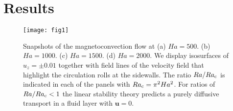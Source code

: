 \documentclass{jfm}
\begin{document}
\section{Results}
\begin{figure}
\centering
\texttt{[image: fig1]}
\caption{Snapshots of the magnetoconvection flow at (a) $Ha=500$. (b) $Ha=1000$. (c) $Ha=1500$. (d) $Ha=2000$. 
We display isosurfaces of $u_z=\pm 0.01$ together with field lines of the velocity field that highlight the circulation rolls 
at the sidewalls. The ratio $Ra/Ra_{\rm c}$ is indicated in each of the panels with $Ra_{\rm c}=\pi^2 Ha^2$. For ratios of $Ra/Ra_{\rm c}<1$ 
the linear stability theory predicts a purely diffusive transport in a fluid layer with ${\bm u}=0$.}
\label{fig:1}
\end{figure}
\end{document}
